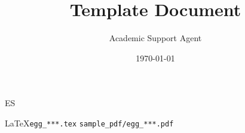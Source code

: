 \documentclass{article}
\title{Template Document}
\author{Academic Support Agent}
\date{\today}
\begin{document}
\maketitle


\section{  }

	 ES 

	\LaTeX  \texttt{egg\_***.tex}  \texttt{sample\_pdf/egg\_***.pdf} 




\section{  }

\newcommand{\ }{ Z }
\newcommand{\ }{99999}
\newcommand{\ }{ }
\newcommand{\ }{ \   }


\noindent
\textbf{ }\\
	 
\\

\noindent
\textbf{ }\\
	 




\section{  }

	 
	 
	 
	 
	 



\end{document}
